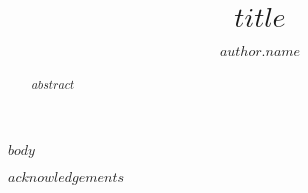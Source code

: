\documentclass[a4j,12pt,twoside]{jreport}
\author{$author.name$}
\title{$title$}
\begin{document}
\maketitle

\begin{abstract}
$abstract$
\end{abstract}

\begin{contents}
\tableofcontents %
\end{contents}

$body$

\acknowledgement
$acknowledgements$


\end{document}
